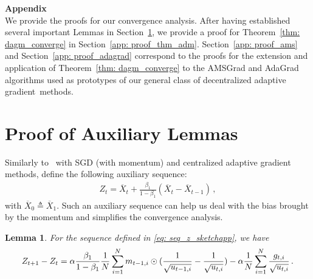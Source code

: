 \documentclass[11pt]{article}
\newtheorem{lemma}{Lemma}
\begin{document}
\clearpage 
\newpage
\appendix
%


\noindent\textbf{\LARGE Appendix}\\

We provide the proofs for our convergence analysis. After having established several important Lemmas in Section~\ref{app: proof_lemmas}, we provide a proof for  Theorem~\ref{thm: dagm_converge} in Section~\ref{app: proof_thm_adm}.
Section~\ref{app: proof_ams} and Section~\ref{app: proof_adagrad} correspond to the proofs for the extension and application of Theorem~\ref{thm: dagm_converge} to the AMSGrad and AdaGrad algorithms used as prototypes of our general class of decentralized adaptive gradient~methods.

 
\section{Proof of Auxiliary Lemmas} \label{app: proof_lemmas}

Similarly to~\cite{yan2018unified, chen2018convergence} with SGD (with momentum) and centralized adaptive gradient methods, define the following auxiliary sequence:
 \begin{align}\label{eq: seq_z_sketchapp}
 Z_{t} = \overline X_t + \frac{\beta_1}{1-\beta_1} (\overline X_t - \overline X_{t-1}) \, ,
 \end{align}
with $\overline X_{0} \triangleq \overline X_1$.
Such an auxiliary sequence can help us deal with the bias brought by the momentum and simplifies the convergence analysis. 

 \begin{lemma}\label{lem: z_diff} 
	For the sequence defined in \eqref{eq: seq_z_sketchapp}, we have
	\begin{align}\notag
	Z_{t+1} - Z_t = \alpha \frac{\beta_1}{1-\beta_1}  \frac{1}{N} \sum_{i=1}^N m_{t-1	,i} \odot (\frac{1}{\sqrt{u_{t-1,i}}} - \frac{1}{\sqrt{u_{t,i}}}) 
	- \alpha \frac{1}{N} \sum_{i=1}^N \frac{g_{t,i}}{\sqrt{u_{t,i}}} \, .
	\end{align}
\end{lemma}
\end{document}
